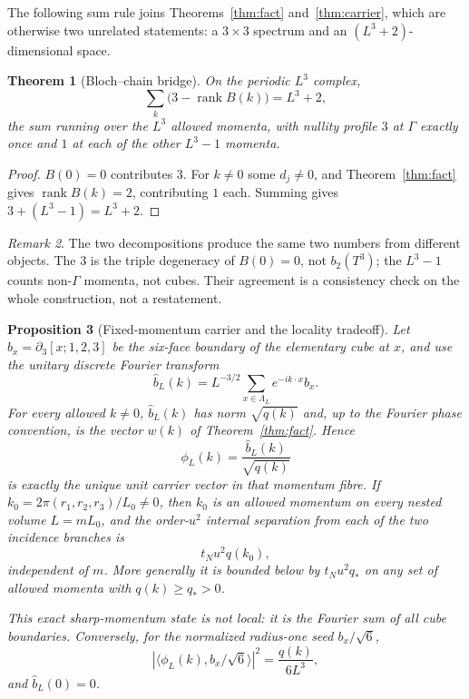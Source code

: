\documentclass[11pt]{article}
\theoremstyle{plain}
\newtheorem{theorem}{Theorem}
\newtheorem{proposition}[theorem]{Proposition}
\theoremstyle{definition}
\theoremstyle{remark}
\newtheorem{remark}[theorem]{Remark}
\newcommand{\chk}[1]{}
\begin{document}
The following sum rule joins Theorems~\ref{thm:fact} and~\ref{thm:carrier},
which are otherwise two unrelated statements: a $3\times3$ spectrum and an
$(L^3+2)$-dimensional space.

\begin{theorem}[Bloch--chain bridge]\label{thm:bridge}
On the periodic $L^3$ complex,
\[
  \sum_{k}\bigl(3-\operatorname{rank}B(k)\bigr)=L^3+2 ,
\]
the sum running over the $L^3$ allowed momenta, with nullity profile
$3$ at $\Gamma$ exactly once and $1$ at each of the other $L^3-1$ momenta.
\end{theorem}

\begin{proof}
$B(0)=0$ contributes $3$. For $k\neq0$ some $d_j\neq0$, and
Theorem~\ref{thm:fact} gives $\operatorname{rank}B(k)=2$, contributing $1$
each. Summing gives $3+(L^3-1)=L^3+2$.
\end{proof}
\chk{the Bloch and chain routes to the carrier agree}

\begin{remark}
The two decompositions produce the same two numbers from different objects.
The $3$ is the triple degeneracy of $B(0)=0$, not $b_2(T^3)$; the $L^3-1$
counts non-$\Gamma$ momenta, not cubes. Their agreement is a consistency check
on the whole construction, not a restatement.
\end{remark}

\begin{proposition}[Fixed-momentum carrier and the locality tradeoff]
\label{prop:fixed-k-carrier}
Let $b_x=\partial_3[x;1,2,3]$ be the six-face boundary of the elementary cube
at $x$, and use the unitary discrete Fourier transform
\[
 \widehat b_L(k)=L^{-3/2}\sum_{x\in\Lambda_L}e^{-ik\cdot x}b_x .
\]
For every allowed $k\ne0$, $\widehat b_L(k)$ has norm $\sqrt{q(k)}$ and,
up to the Fourier phase convention, is the vector $w(k)$ of
Theorem~\ref{thm:fact}. Hence
\[
 \phi_L(k)=\frac{\widehat b_L(k)}{\sqrt{q(k)}}
\]
is exactly the unique unit carrier vector in that momentum fibre. If
$k_0=2\pi(r_1,r_2,r_3)/L_0\ne0$, then $k_0$ is an allowed momentum on every
nested volume $L=mL_0$, and the order-$u^2$ internal separation from each of
the two incidence branches is
\begin{equation}\label{eq:fixed-k-splitting}
 t_Nu^2q(k_0),
\end{equation}
independent of $m$. More generally it is bounded below by
$t_Nu^2q_*$ on any set of allowed momenta with $q(k)\ge q_*>0$.

This exact sharp-momentum state is not local: it is the Fourier sum of all
cube boundaries. Conversely, for the normalized radius-one seed
$b_x/\sqrt6$,
\begin{equation}\label{eq:local-fixed-k-weight}
 \left|\langle\phi_L(k),b_x/\sqrt6\rangle\right|^2
 =\frac{q(k)}{6L^3},
\end{equation}
and $\widehat b_L(0)=0$.
\end{proposition}
\end{document}

